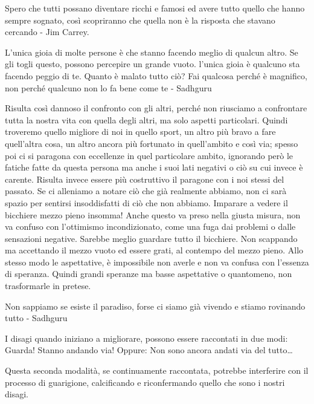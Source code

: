 \documentclass[12pt]{book} %
\begin{document}
Spero che tutti possano diventare ricchi e famosi ed avere tutto quello che hanno sempre sognato, così scopriranno che
quella non è la risposta che stavano cercando - Jim Carrey.

L'unica gioia di molte persone è che stanno facendo meglio di qualcun altro. Se gli togli questo, possono percepire un grande vuoto. l'unica gioia è qualcuno sta facendo peggio di te. Quanto è malato tutto ciò? Fai qualcosa perché è magnifico, non perché qualcuno non lo fa bene come te - Sadhguru

Risulta così dannoso il confronto con gli altri, perché non riusciamo a confrontare tutta la nostra vita con quella
degli altri, ma solo aspetti particolari. Quindi troveremo quello migliore di noi in quello sport, un altro più bravo a
fare quell'altra cosa, un altro ancora più fortunato in quell'ambito e così
via; spesso poi ci si paragona con eccellenze in quel particolare ambito, ignorando però le fatiche fatte da questa persona ma anche i suoi lati negativi o ciò su cui invece è carente. Risulta invece essere più costruttivo il paragone
con i noi stessi del passato. 
Se ci alleniamo a notare ciò che già realmente abbiamo, non ci sarà spazio per sentirsi
insoddisfatti di ciò che non abbiamo. Imparare a vedere il bicchiere mezzo pieno insomma! 
Anche questo va preso nella giusta misura, non va confuso con l'ottimismo
incondizionato, come una fuga dai problemi o dalle sensazioni negative. Sarebbe meglio guardare tutto il bicchiere. Non
scappando ma accettando il mezzo vuoto ed essere grati, al contempo del mezzo pieno. Allo stesso modo le aspettative, è
impossibile non averle e non va confusa con l'essenza di speranza. Quindi grandi speranze ma basse
aspettative o quantomeno, non trasformarle in pretese.

Non sappiamo se esiste il paradiso, forse ci siamo già vivendo e stiamo rovinando tutto - Sadhguru

I disagi quando iniziano a migliorare, possono essere raccontati in due modi:
Guarda! Stanno andando via!
Oppure:
Non sono ancora andati via del tutto…

Questa seconda modalità, se continuamente raccontata, potrebbe interferire con il processo di guarigione, calcificando e riconfermando quello che sono i nostri disagi.
\end{document}
